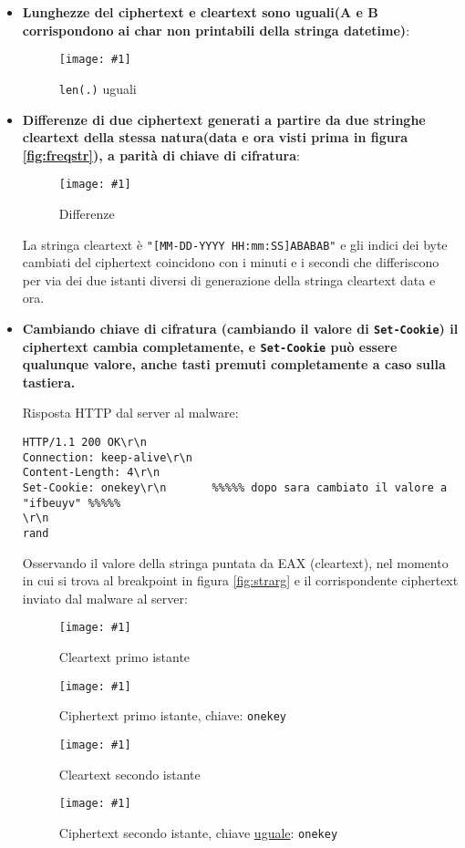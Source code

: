 \documentclass[
    a4paper, %
    11pt %
]{article}
\newcommand{\pic}[4]{\begin{figure}[H]
            \centering
            \texttt{[image: \#1]}
            \caption{#2}
            \label{fig:#1}
            \end{figure}}
\begin{document}
            \begin{itemize}
                \item \textbf{Lunghezze del ciphertext e cleartext sono uguali(A e B corrispondono ai char non printabili della stringa datetime)}:

                    \pic{ce_cmp}{\texttt{len(.)} uguali}{17cm}{4cm}

                \pagebreak

                \item \textbf{Differenze di due ciphertext generati a partire da due stringhe cleartext della
                    stessa natura(data e ora visti prima in figura \ref{fig:freqstr}), a parità di chiave di cifratura}:

                    \pic{diffs}{Differenze}{16cm}{5cm}

                    La stringa cleartext è \texttt{"[MM-DD-YYYY HH:mm:SS]ABABAB"} e gli indici dei byte
                    cambiati del ciphertext coincidono con i minuti e i secondi che differiscono per via dei
                    due istanti diversi di generazione della stringa cleartext data e ora.

                \item \textbf{Cambiando chiave di cifratura (cambiando il valore di \texttt{Set-Cookie}) 
                    il ciphertext cambia completamente, e \texttt{Set-Cookie} può essere qualunque valore,
                    anche tasti premuti completamente a caso sulla tastiera.}

                    Risposta HTTP dal server al malware:

                    \begin{lstlisting}
HTTP/1.1 200 OK\r\n
Connection: keep-alive\r\n
Content-Length: 4\r\n
Set-Cookie: onekey\r\n       %%%%% dopo sara cambiato il valore a "ifbeuyv" %%%%%
\r\n
rand
                    \end{lstlisting}

                    Osservando il valore della stringa puntata da EAX (cleartext), nel momento in cui si trova al breakpoint in figura 
                    \ref{fig:strarg} e il corrispondente ciphertext inviato dal malware al server:

                    \pic{pt0}{Cleartext primo istante}{10cm}{1.5cm}
                    \pic{ct0}{Ciphertext primo istante, chiave: \texttt{onekey}}{10cm}{2cm}
                    
                    \pic{pt1}{Cleartext secondo istante}{10cm}{1.5cm}
                    \pic{ct1}{Ciphertext secondo istante, chiave \underline{uguale}: \texttt{onekey}}{10cm}{2cm}


\end{itemize}
\end{document}
